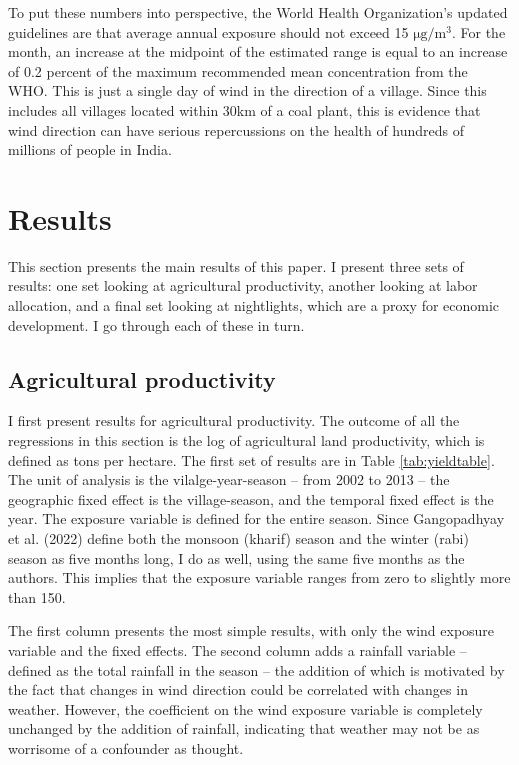 \documentclass[
]{article}
\begin{document}
To put these numbers into perspective, the World Health Organization's updated guidelines are that average annual exposure should not exceed 15 \(\mathrm{\mu g/m^3}\). For the month, an increase at the midpoint of the estimated range is equal to an increase of 0.2 percent of the maximum recommended mean concentration from the WHO. This is just a single day of wind in the direction of a village. Since this includes all villages located within 30km of a coal plant, this is evidence that wind direction can have serious repercussions on the health of hundreds of millions of people in India.

\hypertarget{results}{%
\section{\texorpdfstring{Results \label{results}}{Results }}\label{results}}

This section presents the main results of this paper. I present three sets of results: one set looking at agricultural productivity, another looking at labor allocation, and a final set looking at nightlights, which are a proxy for economic development. I go through each of these in turn.

\hypertarget{agricultural-productivity}{%
\subsection{Agricultural productivity}\label{agricultural-productivity}}

I first present results for agricultural productivity. The outcome of all the regressions in this section is the log of agricultural land productivity, which is defined as tons per hectare. The first set of results are in Table \ref{tab:yieldtable}. The unit of analysis is the vilalge-year-season -- from 2002 to 2013 -- the geographic fixed effect is the village-season, and the temporal fixed effect is the year. The exposure variable is defined for the entire season. Since Gangopadhyay et al. (2022) define both the monsoon (kharif) season and the winter (rabi) season as five months long, I do as well, using the same five months as the authors. This implies that the exposure variable ranges from zero to slightly more than 150.

The first column presents the most simple results, with only the wind exposure variable and the fixed effects. The second column adds a rainfall variable -- defined as the total rainfall in the season -- the addition of which is motivated by the fact that changes in wind direction could be correlated with changes in weather. However, the coefficient on the wind exposure variable is completely unchanged by the addition of rainfall, indicating that weather may not be as worrisome of a confounder as thought.
\end{document}
